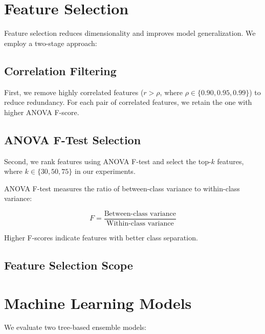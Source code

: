 
\section{Feature Selection}
\label{sec:feature_selection_method}

Feature selection reduces dimensionality and improves model generalization. We employ a two-stage approach:

\subsection{Correlation Filtering}
\label{subsec:correlation_filtering}

First, we remove highly correlated features ($r > \rho$, where $\rho \in \{0.90, 0.95, 0.99\}$) to reduce redundancy. For each pair of correlated features, we retain the one with higher ANOVA F-score.

\subsection{ANOVA F-Test Selection}
\label{subsec:anova}

Second, we rank features using ANOVA F-test and select the top-$k$ features, where $k \in \{30, 50, 75\}$ in our experiments.

ANOVA F-test measures the ratio of between-class variance to within-class variance:

\begin{equation}
F = \frac{\text{Between-class variance}}{\text{Within-class variance}}
\end{equation}

Higher F-scores indicate features with better class separation.

\subsection{Feature Selection Scope}
\label{subsec:selection_scope}


\section{Machine Learning Models}
\label{sec:models}

We evaluate two tree-based ensemble models:

